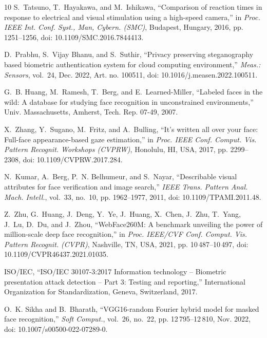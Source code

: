 \documentclass{ieeeaccess}
\begin{document}
\begin{thebibliography}{10}
S.~Tatsuno, T.~Hayakawa, and M.~Ishikawa, ``Comparison of reaction times in
  response to electrical and visual stimulation using a high-speed camera,'' in
  \emph{Proc. IEEE Int. Conf. Syst., Man, Cybern. (SMC)}, Budapest, Hungary,
  2016, pp. 1251--1256, doi: 10.1109/SMC.2016.7844413.

D.~Prabhu, S.~{Vijay Bhanu}, and S.~Suthir, ``Privacy preserving steganography
  based biometric authentication system for cloud computing environment,''
  \emph{Meas.: Sensors}, vol.~24, Dec. 2022, {Art. no.} 100511, doi:
  10.1016/j.measen.2022.100511.

G.~B. Huang, M.~Ramesh, T.~Berg, and E.~Learned-Miller, ``Labeled faces in the
  wild: A database for studying face recognition in unconstrained
  environments,'' Univ. Massachusetts, Amherst, Tech. Rep. 07-49, 2007.

X.~Zhang, Y.~Sugano, M.~Fritz, and A.~Bulling, ``It's written all over your
  face: Full-face appearance-based gaze estimation,'' in \emph{Proc. IEEE Conf.
  Comput. Vis. Pattern Recognit. Workshops (CVPRW)}, Honolulu, HI, USA, 2017,
  pp. 2299--2308, doi: 10.1109/CVPRW.2017.284.

N.~Kumar, A.~Berg, P.~N. Belhumeur, and S.~Nayar, ``Describable visual
  attributes for face verification and image search,'' \emph{IEEE Trans.
  Pattern Anal. Mach. Intell.}, vol.~33, no.~10, pp. 1962--1977, 2011, doi:
  10.1109/TPAMI.2011.48.

Z.~Zhu, G.~Huang, J.~Deng, Y.~Ye, J.~Huang, X.~Chen, J.~Zhu, T.~Yang, J.~Lu,
  D.~Du, and J.~Zhou, ``{WebFace260M}: A benchmark unveiling the power of
  million-scale deep face recognition,'' in \emph{Proc. IEEE/CVF Conf. Comput.
  Vis. Pattern Recognit. (CVPR)}, Nashville, TN, USA, 2021, pp.
  10\,487--10\,497, doi: 10.1109/CVPR46437.2021.01035.

{ISO/IEC}, ``{ISO/IEC} 30107-3:2017 {Information technology} -- {Biometric}
  presentation attack detection -- {Part} 3: {Testing} and reporting,''
  International Organization for Standardization, Geneva, Switzerland, 2017.

O.~K. Sikha and B.~Bharath, ``{VGG16}-random {Fourier} hybrid model for masked
  face recognition,'' \emph{Soft Comput.}, vol.~26, no.~22, pp.
  12\,795--12\,810, Nov. 2022, doi: 10.1007/s00500-022-07289-0.


\end{thebibliography}
\end{document}
